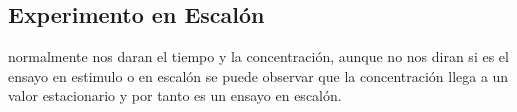 \subsection{Experimento en Escalón}

\noindent normalmente nos daran el tiempo y la concentración, aunque no nos diran si es el ensayo en estimulo o en escalón se puede observar que la concentración llega a un valor estacionario y por tanto es un ensayo en escalón.
\begin{table}[htbp]
    \centering
    \caption{Datos y cálculos del Experimento en Escalón.}
    \label{tab:excel_escalon_nuevo}
\end{table}
